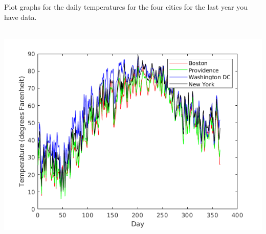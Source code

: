 Plot graphs for the daily temperatures for the four cities for the last year you have data.

\begin{solution}\ \\
\includegraphics{e20p6.png}
\end{solution}